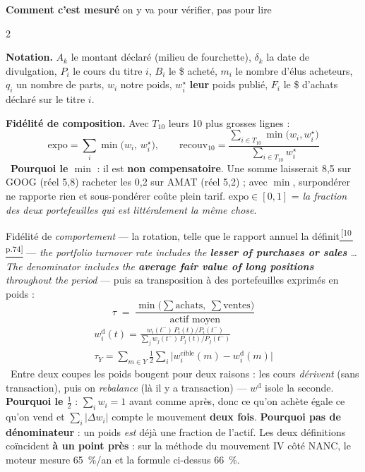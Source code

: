\documentclass[9pt,a4paper]{extarticle}
\newcommand{\obs}[1]{\vspace{0.2mm}\hangindent=3.4mm\hangafter=0{\color{bleu}\footnotesize\textbullet}~{\small #1}\par\vspace{0.2mm}}
\newcommand{\rf}[3]{\href{docs_nanc_gop/#2\#page=#3}{\color{bleu}\textsuperscript{\,[#1\,p.#3]}}}
\newcommand{\sAtrois}[1]{\rf{10}{10-rapport-annuel-FY2023.pdf}{#1}}
\begin{document}
\vspace{1mm}
{\color{bleu}\bfseries\large Comment c'est mesuré}\hfill{\footnotesize\color{grisf} on y va pour vérifier, pas pour lire}\par\vspace{1.2mm}
\begin{multicols}{2}\raggedright
{\footnotesize\textbf{Notation.} $A_k$ le montant déclaré (milieu de fourchette), $\delta_k$ la date de divulgation, $P_i$ le cours du titre $i$, $B_i$ le \$ acheté, $m_i$ le nombre d'élus acheteurs, $q_i$ un nombre de parts, $w_i$ notre poids, $w^{\star}_i$ \textbf{leur} poids publié, $F_i$ le \$ d'achats déclaré sur le titre $i$.\par}
\textbf{Fidélité de composition.} Avec $T_{10}$ leurs 10 plus grosses lignes :
\[ \mathrm{expo}=\sum_i\min\!\bigl(w_i,\,w^{\star}_i\bigr),\qquad
   \mathrm{recouv}_{10}=\frac{\sum_{i\in T_{10}}\min\!\bigl(w_i,w^{\star}_i\bigr)}{\sum_{i\in T_{10}}w^{\star}_i} \]
\obs{\textbf{Pourquoi le $\min$} : il est \textbf{non compensatoire}. Une somme laisserait 8,5 sur GOOG (réel 5,8) \og{}racheter\fg{} les 0,2 sur AMAT (réel 5,2) ; avec $\min$, surpondérer ne rapporte rien et sous-pondérer coûte plein tarif. $\mathrm{expo}\in[0,1]$ = \emph{la fraction des deux portefeuilles qui est littéralement la même chose}.}
Fidélité de \emph{comportement} --- la rotation, telle que le rapport annuel la définit\sAtrois{74} --- \og{}\emph{the portfolio turnover rate includes the \textbf{lesser of purchases or sales} \ldots{} The denominator includes the \textbf{average fair value of long positions} throughout the period}\fg{} --- puis sa transposition à des portefeuilles exprimés en poids :
\[ \tau \;=\; \frac{\min\bigl(\textstyle\sum\text{achats},\ \sum\text{ventes}\bigr)}{\text{actif moyen}} \]
\[ \begin{gathered}
w^{\mathrm{d}}_i(t)=\frac{w_i(t^-)\,P_i(t)/P_i(t^-)}{\sum_j w_j(t^-)\,P_j(t)/P_j(t^-)} \\[0.6mm]
\tau_Y=\sum_{m\in Y}\tfrac12\sum_i\bigl|w^{\text{cible}}_i(m)-w^{\mathrm{d}}_i(m)\bigr|
\end{gathered} \]
\obs{Entre deux coupes les poids bougent pour deux raisons : les cours \emph{dérivent} (sans transaction), puis on \emph{rebalance} (là il y a transaction) --- $w^{\mathrm{d}}$ isole la seconde. \textbf{Pourquoi le $\tfrac12$} : $\sum_i w_i=1$ avant comme après, donc ce qu'on achète égale ce qu'on vend et $\sum_i|\Delta w_i|$ compte le mouvement \textbf{deux fois}. \textbf{Pourquoi pas de dénominateur} : un poids \emph{est} déjà une fraction de l'actif. Les deux définitions coïncident \textbf{à un point près} : sur la méthode du mouvement IV côté NANC, le moteur mesure 65~\%/an et la formule ci-dessus 66~\%.}

\end{multicols}
\end{document}
